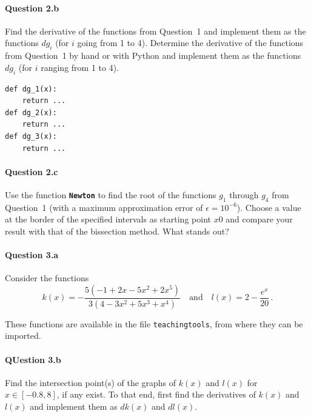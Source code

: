 \paragraph{Question 2.b}
\ifmathematica
Find the derivative of the functions from Question~1 and implement them as the functions $dg_i$ (for $i$ going from 1 to 4).
\fi
\ifpython
Determine the derivative of the functions from Question~1 by hand or with Python and implement them as the functions $dg_i$ (for $i$ ranging from 1 to 4).
\fi
\begin{lstlisting}
def dg_1(x):
	return ...
def dg_2(x):
	return ...
def dg_3(x):
	return ...
\end{lstlisting}



\paragraph{Question 2.c}
Use the function \textbf{\lstinline|Newton|} to find the root of the functions $g_1$ through $g_4$ from Question~1 (with a maximum approximation error of $\epsilon = 10^{-6}$). Choose a value at the border of the specified intervals as starting point $x0$ and compare your result with that of the bissection method. What stands out?


\paragraph{Question 3.a}
Consider the functions
 $$
 k(x) = -\dfrac{5(-1+2x-5x^2+2x^5)}{3(4-3x^2+5x^3+x^4)} \quad\text{and}\quad l(x) = 2-\dfrac{e^x}{20}\,.
 $$

These functions are available in the file \lstinline|teachingtools|, from where they can be imported.

\paragraph{QUestion 3.b}
Find the intersection point(s) of the graphs of $k(x)$ and $l(x)$ for $x \in [-0.8,8]$, if any exist. To that end, first find the derivatives of $k(x)$ and $l(x)$ and implement them as $dk(x)$ and $dl(x)$.

\fi


